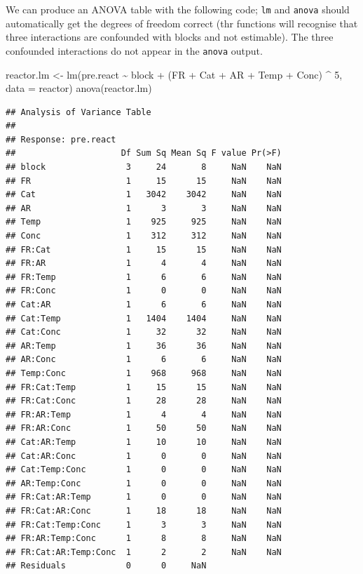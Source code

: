\documentclass[
]{book}
\newenvironment{Shaded}{\begin{snugshade}}{\end{snugshade}}
\newcommand{\AttributeTok}[1]{\textcolor[rgb]{0.77,0.63,0.00}{#1}}
\newcommand{\DecValTok}[1]{\textcolor[rgb]{0.00,0.00,0.81}{#1}}
\newcommand{\FunctionTok}[1]{\textcolor[rgb]{0.00,0.00,0.00}{#1}}
\newcommand{\NormalTok}[1]{#1}
\newcommand{\OtherTok}[1]{\textcolor[rgb]{0.56,0.35,0.01}{#1}}
\newcommand{\SpecialCharTok}[1]{\textcolor[rgb]{0.00,0.00,0.00}{#1}}
\theoremstyle{definition}
\theoremstyle{definition}
\theoremstyle{definition}
\theoremstyle{definition}
\theoremstyle{remark}
\begin{document}
We can produce an ANOVA table with the following code; \texttt{lm} and \texttt{anova} should automatically get the degrees of freedom correct (thr functions will recognise that three interactions are confounded with blocks and not estimable). The three confounded interactions do not appear in the \texttt{anova} output.

\begin{Shaded}
\begin{Highlighting}[]
\NormalTok{reactor.lm }\OtherTok{\textless{}{-}} \FunctionTok{lm}\NormalTok{(pre.react }\SpecialCharTok{\textasciitilde{}}\NormalTok{ block }\SpecialCharTok{+}\NormalTok{ (FR }\SpecialCharTok{+}\NormalTok{ Cat }\SpecialCharTok{+}\NormalTok{ AR }\SpecialCharTok{+}\NormalTok{ Temp }\SpecialCharTok{+}\NormalTok{ Conc) }\SpecialCharTok{\^{}} \DecValTok{5}\NormalTok{, }\AttributeTok{data =}\NormalTok{ reactor)}
\FunctionTok{anova}\NormalTok{(reactor.lm)}
\end{Highlighting}
\end{Shaded}

\begin{verbatim}
## Analysis of Variance Table
## 
## Response: pre.react
##                     Df Sum Sq Mean Sq F value Pr(>F)
## block                3     24       8     NaN    NaN
## FR                   1     15      15     NaN    NaN
## Cat                  1   3042    3042     NaN    NaN
## AR                   1      3       3     NaN    NaN
## Temp                 1    925     925     NaN    NaN
## Conc                 1    312     312     NaN    NaN
## FR:Cat               1     15      15     NaN    NaN
## FR:AR                1      4       4     NaN    NaN
## FR:Temp              1      6       6     NaN    NaN
## FR:Conc              1      0       0     NaN    NaN
## Cat:AR               1      6       6     NaN    NaN
## Cat:Temp             1   1404    1404     NaN    NaN
## Cat:Conc             1     32      32     NaN    NaN
## AR:Temp              1     36      36     NaN    NaN
## AR:Conc              1      6       6     NaN    NaN
## Temp:Conc            1    968     968     NaN    NaN
## FR:Cat:Temp          1     15      15     NaN    NaN
## FR:Cat:Conc          1     28      28     NaN    NaN
## FR:AR:Temp           1      4       4     NaN    NaN
## FR:AR:Conc           1     50      50     NaN    NaN
## Cat:AR:Temp          1     10      10     NaN    NaN
## Cat:AR:Conc          1      0       0     NaN    NaN
## Cat:Temp:Conc        1      0       0     NaN    NaN
## AR:Temp:Conc         1      0       0     NaN    NaN
## FR:Cat:AR:Temp       1      0       0     NaN    NaN
## FR:Cat:AR:Conc       1     18      18     NaN    NaN
## FR:Cat:Temp:Conc     1      3       3     NaN    NaN
## FR:AR:Temp:Conc      1      8       8     NaN    NaN
## FR:Cat:AR:Temp:Conc  1      2       2     NaN    NaN
## Residuals            0      0     NaN
\end{verbatim}
\end{document}
